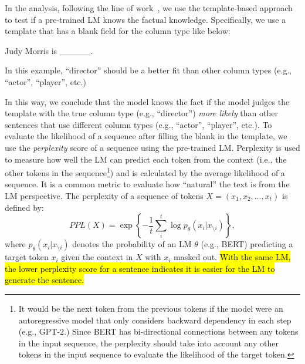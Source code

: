 In the analysis, following the line of work~\cite{Petroni:2019:LAMA,Jiang:2020:HowCanWeKnowLM,Roberts:2020:HowMuchKnowledge}, we use the template-based approach to test if a pre-trained LM knows the factual knowledge. 
%
Specifically, we use a template that has a blank field for the column type like below:
%
\begin{center}
    Judy Morris is \_\_\_\_\_.
\end{center}
%
In this example, ``director'' should be a better fit than other column types (e.g., ``actor'', ``player'', etc.)

In this way, we conclude that the model knows the fact if the model judges the template with the true column type (e.g., ``director'') {\em more likely} than other sentences that use different column types (e.g., ``actor'', ``player'', etc.).
%
To evaluate the likelihood of a sequence after filling the blank in the template, we use the {\em perplexity} score of a sequence using the pre-trained LM.
%
Perplexity is used to measure how well the LM can predict each token from the context (i.e., the other tokens in the sequence\footnote{It would be the next token from the previous tokens if the model were an autoregressive model that only considers backward dependency in each step (e.g., GPT-2.) Since BERT has bi-directional connections between any tokens in the input sequence, the perplexity should take into account any other tokens in the input sequence to evaluate the likelihood of the target token.}) and is calculated by the average likelihood of a sequence. It is a common metric to evaluate how ``natural'' the text is from the LM perspective.
%
%
The perplexity of a sequence of tokens $X = (x_1, x_2, \dots, x_t)$ is defined by:
\begin{equation}
    PPL(X) = \exp \left\{- \frac{1}{t}\sum_i^t \log p_\theta(x_i | x_{\setminus i}) \right\},
\end{equation}
%
%
where $p_\theta(x_i | x_{\setminus i})$ denotes the probability of an LM $\theta$ (e.g., BERT) predicting a target token $x_i$ given the context in $X$ with $x_i$ masked out.
\hl{With the same LM, the lower perplexity score for a sentence indicates it is easier for the LM to generate the sentence.}


